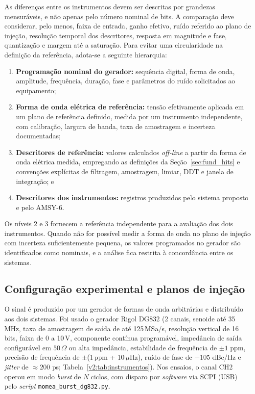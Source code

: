As diferenças entre os instrumentos devem ser descritas por grandezas mensuráveis, e não apenas pelo número nominal de bits. A comparação deve considerar, pelo menos, faixa de entrada, ganho efetivo, ruído referido ao plano de injeção, resolução temporal dos descritores, resposta em magnitude e fase, quantização e margem até a saturação. Para evitar uma circularidade na definição da referência, adota-se a seguinte hierarquia:

\begin{enumerate}
	\item \textbf{Programação nominal do gerador:} sequência digital, forma de onda, amplitude, frequência, duração, fase e parâmetros do ruído solicitados ao equipamento; 
	
	\item \textbf{Forma de onda elétrica de referência:} tensão efetivamente aplicada em um plano de referência definido, medida por um instrumento independente, com calibração, largura de banda, taxa de amostragem e incerteza documentadas;
	
	\item \textbf{Descritores de referência:} valores calculados \textit{off-line} a partir da forma de onda elétrica medida, empregando as definições da Seção~\ref{sec:fund_hits} e convenções explícitas de filtragem, amostragem, limiar, DDT e janela de integração; e 
	
	\item \textbf{Descritores dos instrumentos:} registros produzidos pelo sistema proposto e pelo AMSY-6.
\end{enumerate}

Os níveis 2 e 3 fornecem a referência independente para a avaliação dos dois instrumentos. Quando não for possível medir a forma de onda no plano de injeção com incerteza suficientemente pequena, os valores programados no gerador são identificados como nominais, e a análise fica restrita à concordância entre os sistemas.

\subsection{Configuração experimental e planos de injeção}
\label{v2:subsec:configuracao_experimental}

O sinal é produzido por um gerador de formas de onda arbitrárias e distribuído aos dois sistemas. Foi usado o gerador Rigol DG832 (2 canais, senoide até 35\,MHz, taxa de amostragem de saída de até 125\,MSa/s, resolução vertical de 16 bits, faixa de 0 a 10\,V, componente contínua programável, impedância de saída configurável em \(50\,\Omega\) ou alta impedância, estabilidade de frequência de \(\pm 1\) ppm, precisão de frequência de \(\pm\)(1\,ppm + 10\,\(\mu\)Hz), ruído de fase de \(-105\) dBc/Hz e \textit{jitter} de \(\approx 200\) ps; Tabela~\ref{v2:tab:instrumentos}). Nos ensaios, o canal CH2 operou em modo \textit{burst} de \(N\) ciclos, com disparo por \textit{software} via SCPI (USB) pelo \textit{script} \texttt{momea\_burst\_dg832.py}.


